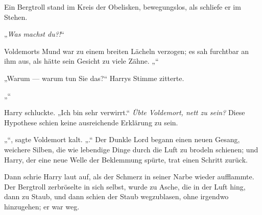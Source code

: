Ein Bergtroll stand im Kreis der Obelisken, bewegungslos, als schliefe er im Stehen.

„\emph{Was machst du?!}“

Voldemorts Mund war zu einem breiten Lächeln verzogen; es sah furchtbar an ihm aus, als hätte sein Gesicht zu viele Zähne.
„“

„Warum — warum tun Sie das?“ Harrys Stimme zitterte.

„“

Harry schluckte.
„Ich bin sehr verwirrt.“
\emph{Übte Voldemort, nett zu sein?} Diese Hypothese schien keine ausreichende Erklärung zu sein.

„“, sagte Voldemort kalt. „.“
Der Dunkle Lord begann einen neuen Gesang, weichere Silben, die wie lebendige Dinge durch die Luft zu brodeln schienen; und Harry, der eine neue Welle der Beklemmung spürte, trat einen Schritt zurück.

Dann schrie Harry laut auf, als der Schmerz in seiner Narbe wieder aufflammte. Der Bergtroll zerbröselte in sich selbst, wurde zu Asche, die in der Luft hing, dann zu Staub, und dann schien der Staub wegzublasen, ohne irgendwo hinzugehen; er war weg.

